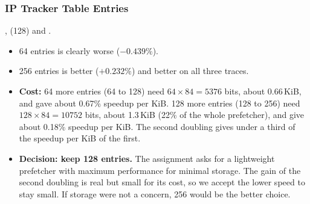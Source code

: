 \subsubsection{IP Tracker Table Entries}
,  (128) and .
\tSw
{}\tAc
{}
\begin{itemize}
  \item 64 entries is clearly worse ($-0.439\%$).
  \item 256 entries is better ($+0.232\%$) and better on all three traces.
  \item \textbf{Cost:} 64 more entries (64 to 128) need $64 \times 84 = 5376$ bits, about 0.66\,KiB, and gave about 0.67\%
        speedup per KiB. 128 more entries (128 to 256) need $128 \times 84 = 10752$ bits, about 1.3\,KiB (22\% of the
        whole prefetcher), and give about 0.18\% speedup per KiB. The second doubling gives under a third of the
        speedup per KiB of the first.
  \item \textbf{Decision: keep 128 entries.} The assignment asks for a lightweight prefetcher with maximum performance
        for minimal storage. The gain of the second doubling is real but small for its cost, so we accept the lower
        speed to stay small. If storage were not a concern, 256 would be the better choice.
\end{itemize}

